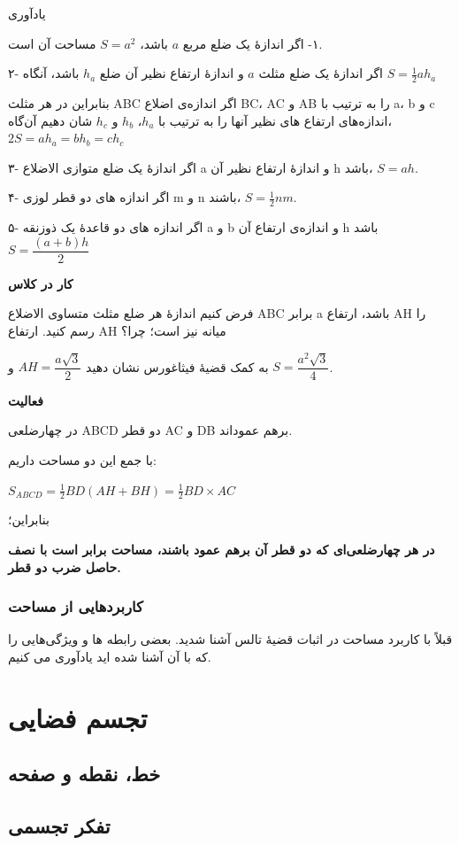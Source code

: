 \documentclass[12pt, a4paper]{book}
\begin{document}
یادآوری

١- اگر اندازهٔ یک ضلع مربع $a$ باشد، $S=a^2$ مساحت آن است.

۲- اگر اندازهٔ یک ضلع مثلث $a$ و اندازهٔ ارتفاع نظیر آن ضلع $h_a$ باشد، آنگاه $S = \frac12 ah_a$

بنابراین در هر مثلث ABC اگر اندازه‌ی اضلاع BC، AC و AB را به ترتیب با a، b و c اندازه‌های ارتفاع های نظیر آنها را به ترتیب با $h_a$، $h_b$ و $h_c$ شان دهیم آن‌گاه، $2S = ah_a = bh_b = ch_c$

۳- اگر اندازهٔ یک ضلع متوازی الاضلاع a و اندازهٔ ارتفاع نظیر آن h باشد، $S=ah$.

۴- اگر اندازه های دو قطر لوزی m و n باشند، $S=\frac12 nm$.

۵- اگر اندازه های دو قاعدهٔ یک ذوزنقه a و b و اندازه‌ی ارتفاع آن h باشد $S = \dfrac{(a+b)h}2$

\textbf{کار در کلاس}

فرض کنیم اندازهٔ هر ضلع مثلث متساوی الاضلاع ABC برابر a باشد، ارتفاع AH را رسم کنید. ارتفاع AH میانه نیز است؛ چرا؟

به کمک قضیهٔ فیثاغورس نشان دهید 
$AH = \dfrac{a\sqrt{3}}2$
و 
$S = \dfrac{a^2 \sqrt{3}}{4}$.

\textbf{فعالیت}

در چهارضلعی ABCD دو قطر AC و DB برهم عموداند.

با جمع این دو مساحت داریم:

$S_{ABCD} = \frac12 BD (AH + BH) = \frac12 BD \times AC$

بنابراین؛

\textbf{در هر چهارضلعی‌ای که دو قطر آن برهم عمود باشند، مساحت برابر است با نصف حاصل ضرب دو قطر. }

\subsection{کاربردهایی از مساحت}
قبلاً با کاربرد مساحت در اثبات قضیهٔ تالس آشنا شدید. بعضی رابطه ها و ویژگی‌هایی را که با آن آشنا شده اید یادآوری می کنیم.

\chapter{تجسم فضایی}

\section{خط، نقطه و صفحه}

\section{تفکر تجسمی}
	
\end{document}
